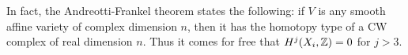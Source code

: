 \begin{remark}
In fact, the Andreotti-Frankel theorem \cite{andreotti_affinecw} states the following: if $V$ is any smooth affine variety of complex dimension $n$, then it has the homotopy type of a CW complex of real dimension $n$. Thus it comes for free that $H^j(X_i,\mathbb{Z})=0$ for $j > 3$.
\end{remark}
 
